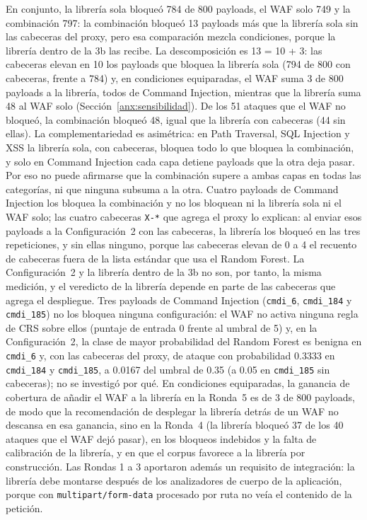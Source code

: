 En conjunto, la librería sola bloqueó 784 de 800 payloads, el WAF solo 749 y la combinación 797: la
combinación bloqueó 13 payloads más que la librería sola sin las cabeceras del proxy, pero esa
comparación mezcla condiciones, porque la librería dentro de la 3b las recibe. La descomposición es
13 = 10 + 3: las cabeceras elevan en 10 los payloads que bloquea la librería sola (794 de 800 con
cabeceras, frente a 784) y, en condiciones equiparadas, el WAF suma 3 de 800 payloads a la
librería, todos de Command Injection, mientras que la librería suma 48 al WAF solo
(Sección~\ref{anx:sensibilidad}). De los 51 ataques que el WAF no bloqueó, la combinación bloqueó
48, igual que la librería con cabeceras (44 sin ellas). La complementariedad es asimétrica: en Path
Traversal, SQL Injection y XSS la librería sola, con cabeceras, bloquea todo lo que bloquea la
combinación, y solo en Command Injection cada capa detiene payloads que la otra deja pasar. Por eso no puede afirmarse que la combinación supere a ambas capas en todas
las categorías, ni que ninguna subsuma a la otra. Cuatro payloads de Command Injection los bloquea
la combinación y no los bloquean ni la librería sola ni el WAF solo; las cuatro cabeceras
\texttt{X-*} que agrega el proxy lo explican: al enviar esos payloads a la Configuración~2 con las
cabeceras, la librería los bloqueó en las tres repeticiones, y sin ellas ninguno, porque las
cabeceras elevan de 0 a 4 el recuento de cabeceras fuera de la lista estándar que usa el Random
Forest. La Configuración~2 y la librería dentro de la 3b no son, por tanto, la misma medición, y el
veredicto de la librería depende en parte de las cabeceras que agrega el despliegue. Tres payloads
de Command Injection (\texttt{cmdi\_6}, \texttt{cmdi\_184} y \texttt{cmdi\_185}) no los bloquea
ninguna configuración: el WAF no activa ninguna regla de CRS sobre ellos (puntaje de entrada 0
frente al umbral de 5) y, en la Configuración~2, la clase de mayor probabilidad del Random Forest
es benigna en \texttt{cmdi\_6} y, con las cabeceras del proxy, de ataque con probabilidad 0.3333 en
\texttt{cmdi\_184} y \texttt{cmdi\_185}, a 0.0167 del umbral de 0.35 (a 0.05 en \texttt{cmdi\_185}
sin cabeceras); no se investigó por qué. En condiciones equiparadas, la ganancia de cobertura de añadir el WAF a
la librería en la Ronda~5 es de 3 de 800 payloads, de modo que la recomendación de desplegar la
librería detrás de un WAF no descansa en esa ganancia, sino en la Ronda~4 (la librería bloqueó 37 de
los 40 ataques que el WAF dejó pasar), en los bloqueos indebidos y la falta de calibración de la
librería, y en que el corpus favorece a la librería por construcción. Las Rondas 1 a 3 aportaron
además un requisito de integración: la librería debe montarse después de los analizadores de
cuerpo de la aplicación, porque con \texttt{multipart/form-data} procesado por ruta no veía el
contenido de la petición.

